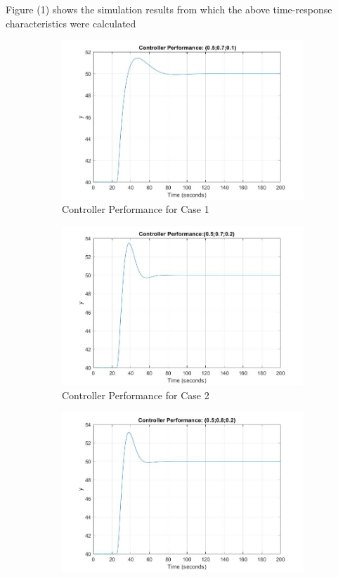 \documentclass[a4paper,12pt,oneside,onecolumn]{article} %
\begin{document}
Figure (1) shows the simulation results from which the above time-response characteristics were calculated
\begin{figure}[H]
\centering
\begin{subfigure}{0.4\textwidth}
  \includegraphics[width = \textwidth]{ex_5_1m}
\caption{Controller Performance for Case 1}
\end{subfigure}
\vspace{1em}
\begin{subfigure}{0.4\textwidth}
  \includegraphics[width = \textwidth]{ex_5_2m}
\caption{Controller Performance for Case 2}
\end{subfigure}
\vspace{1em}
\begin{subfigure}{0.4\textwidth}
 \includegraphics[width = \textwidth]{ex_5_3m}

\end{subfigure}
\end{figure}
\end{document}
